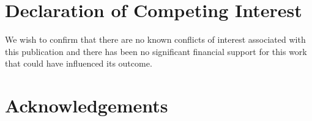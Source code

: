 \documentclass[preprint,12pt, a4paper]{elsarticle}
\begin{document}
\section*{Declaration of Competing Interest}
We wish to confirm that there are no known conflicts of interest associated with this publication and there has been no significant financial support for this work that could have influenced its outcome.


\section*{Acknowledgements}


 

\end{document}
